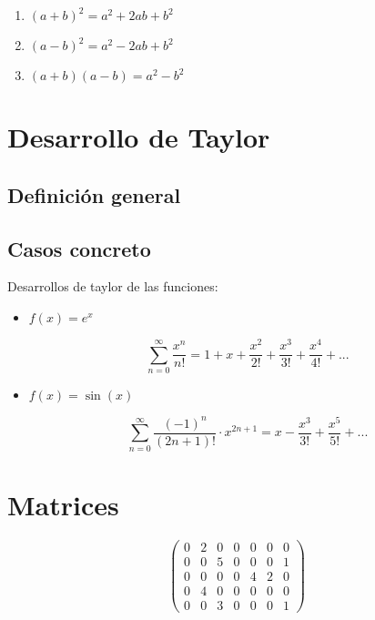 \documentclass{article}
\begin{document}
\begin{enumerate}
\item $ \left(a+b\right)^2 = a^2 + 2ab + b^2 $
\item $ \left(a-b\right)^2 = a^2 - 2ab + b^2 $
\item $ \left(a+b\right)\left(a-b\right) = a^2-b^2 $
\end{enumerate}

\section{Desarrollo de Taylor}

\subsection{Definición general}


\subsection{Casos concreto}

Desarrollos de taylor de las funciones:

\begin{itemize}
\item $f(x)=e^x$

\[ \sum_{n=0}^{\infty} \frac{x^n}{n!}  =  1 + x + \frac{x^2}{2!} + \frac{x^3}{3!} + \frac{x^4}{4!} + ...\]


\item $f(x) = \sin (x)$

\[ \sum_{n=0}^{\infty} \frac{(-1)^n}{(2n+1)!}·x^{2n+1}  =  x - \frac{x^3}{3!} + \frac{x^5}{5!} + ...\]


\end{itemize}

\section{Matrices}
\[ \begin{pmatrix}
   0 & 2 & 0 & 0 & 0 & 0 & 0 \\
   0 & 0 & 5 & 0 & 0 & 0 & 1 \\
   0 & 0 & 0 & 0 & 4 & 2 & 0 \\
   0 & 4 & 0 & 0 & 0 & 0 & 0 \\
   0 & 0 & 3 & 0 & 0 & 0 & 1
\end{pmatrix} \]
\end{document}
